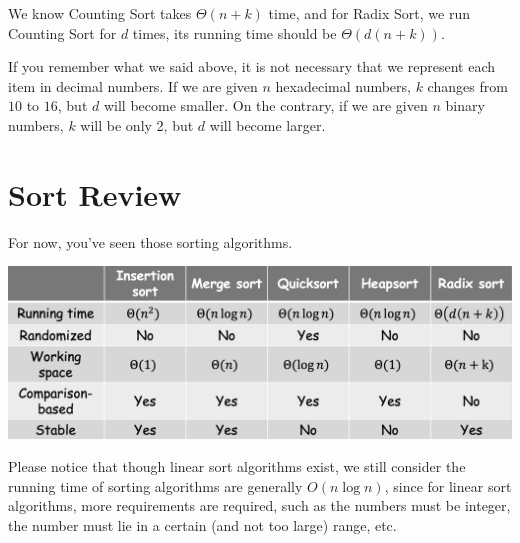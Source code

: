 \begin{spacing}{1.3}
    We know Counting Sort takes $\Theta(n+k)$ time, and for Radix Sort, we run 
    Counting Sort for $d$ times, its running time should be $\Theta(d(n+k))$.

    If you remember what we said above, it is not necessary that we represent each 
    item in decimal numbers. If we are given $n$ hexadecimal numbers, $k$ changes 
    from $10$ to $16$, but $d$ will become smaller. On the contrary, if we are given 
    $n$ binary numbers, $k$ will be only 2, but $d$ will become larger.


    \section{Sort Review}

    For now, you've seen those sorting algorithms.
    \begin{center}
        \includegraphics[scale=0.4]{images/06-sort-review.png}
    \end{center}

    Please notice that though linear sort algorithms exist, we still consider 
    the running time of sorting algorithms are generally $O(n\log n)$, since 
    for linear sort algorithms, more requirements are required, such as 
    the numbers must be integer, the number must lie in a certain (and not 
    too large) range, etc.

    
\end{spacing}
